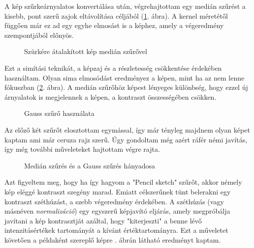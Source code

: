 
A kép szűrkeárnyalatos konvertálása után, végrehajtottam egy medián szűrést a kisebb, pont szerű zajok eltávolítása céljából (\ref{fig:pencil2}. ábra). A kernel méretétől függően már ez ad egy egyhe elmosást is a képhez, amely a végeredmény szempontjából előnyös.

\begin{figure}[ht]
\centering
{}
\caption{Szürkére átalakított kép medián szűrővel} 
\label{fig:pencil2}
\end{figure}


Ezt a simítási teknikát, a képzaj  és a részletesség csökkentése érdekében használtam. Olyan sima elmosódást eredményez a képen, mint ha az nem lenne fókuszban (\ref{fig:pencil3}. ábra). A medián szűrőhöz képest lényeges különbség, hogy ezzel új árnyalatok is megjelennek a képen, a kontraszt összességében csökken.

\begin{figure}[ht]
\centering
{}
\caption{Gauss szűrő használata } 
\label{fig:pencil3}
\end{figure}



Az előző két szűrőt elosztottam egymással, így már tényleg majdnem olyan képet kaptam ami már ceruza rajz szerű. Úgy gondoltam még azért ráfér némi javítás, így még további műveleteket hajtottam végre rajta.

\begin{figure}[ht] 
\centering
{}
\caption{Medián szűrés és a Gauss szűrés hányadosa } 
\label{fig: pencil4}
\end{figure}


Azt figyeltem meg, hogy ha így hagyom a "Pencil sketch" szűrőt, akkor némely kép eléggé kontraszt szegény marad. Emiatt célszerűnek tünt belerakni egy kontraszt széthúzást, a szebb végeredmény érdekében. A széthúzás (vagy másnéven \textit{normalizáció}) egy egyszerű képjavító eljárás, amely megpróbálja javítani a kép kontrasztját azáltal, hogy "kiterjeszti" a benne lévő intenzitásértékek tartományát a kívánt értéktartományra. Ezt a műveletet követően a példaként szereplő képre . ábrán látható eredményt kaptam.

